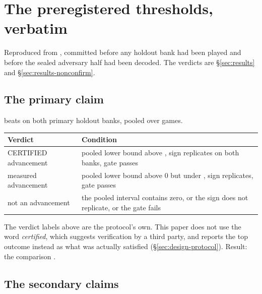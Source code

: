 \section{The preregistered thresholds, verbatim}
\label{app:thresholds}

Reproduced from , committed before any holdout bank had been
played and before the sealed adversary half had been decoded. The verdicts are
\S\ref{sec:results} and \S\ref{sec:results-nonconfirm}.

\subsection*{The primary claim}

\sestina{} beats \fcheap{} on both primary holdout banks, pooled over \vsevenBtwoFcheapN{} games.

\begin{center}\tabfont
\begin{tabularx}{\linewidth}{@{}l L@{}}
\toprule
Verdict & Condition \\
\midrule
CERTIFIED advancement & pooled lower bound above \vsevenPrimaryFloor{}, sign replicates on both banks, gate passes \\
measured advancement & pooled lower bound above 0 but under \vsevenPrimaryFloor{}, sign replicates, gate passes \\
not an advancement & the pooled interval contains zero, or the sign does not replicate, or the gate fails \\
\bottomrule
\end{tabularx}
\end{center}

\noindent
The verdict labels above are the protocol's own. This paper does not use the word \emph{certified},
which suggests verification by a third party, and reports the top outcome instead as what was
actually satisfied (\S\ref{sec:design-protocol}). Result: the comparison
\textbf{\vsevenPrimaryVerdict{}}.

\subsection*{The secondary claims}

